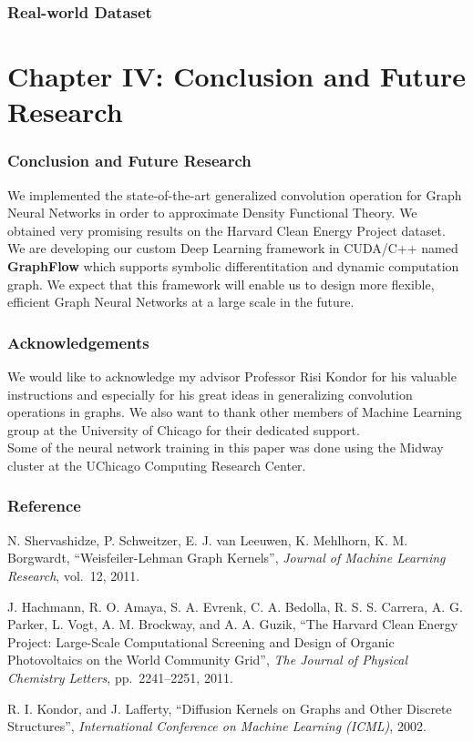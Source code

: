 \documentclass{beamer}
\begin{document}
\begin{frame}
\frametitle{Real-world Dataset}
\end{frame}

\section{Chapter IV: Conclusion and Future Research}

\begin{frame}
\frametitle{Conclusion and Future Research}
\begin{justify}
We implemented the state-of-the-art generalized convolution operation for Graph Neural Networks in order to approximate Density Functional Theory. We obtained very promising results on the Harvard Clean Energy Project dataset.
$$$$
We are developing our custom Deep Learning framework in CUDA/C++ named \textbf{GraphFlow} which supports symbolic differentitation and dynamic computation graph. We expect that this framework will enable us to design more flexible, efficient Graph Neural Networks at a large scale in the future.
\end{justify}
\end{frame}

\begin{frame}
\frametitle{Acknowledgements}
\begin{justify}
We would like to acknowledge my advisor Professor Risi Kondor for his valuable instructions and especially for his great ideas in generalizing convolution operations in graphs. We also want to thank other members of Machine Learning group at the University of Chicago for their dedicated support.
$$$$
Some of the neural network training in this paper was done using the Midway cluster at the UChicago Computing Research Center.
\end{justify}
\end{frame}

\begin{frame}
\frametitle{Reference}
\begin{justify}
\begin{thebibliography}{9}

   N. Shervashidze, P. Schweitzer, E. J. van Leeuwen, K. Mehlhorn, K. M. Borgwardt,
   ``Weisfeiler-Lehman Graph Kernels'',
   \textit{Journal of Machine Learning Research}, vol.~12, 2011.
   
   J. Hachmann, R. O. Amaya, S. A. Evrenk, C. A. Bedolla, R. S. S. Carrera, A. G. Parker, L. Vogt, A. M. Brockway, and A. A. Guzik,
   ``The Harvard Clean Energy Project: Large-Scale Computational Screening and Design of Organic Photovoltaics on the World Community Grid'',
   \textit{The Journal of Physical Chemistry Letters}, pp.~2241--2251, 2011.

   R. I. Kondor, and J. Lafferty,
   ``Diffusion Kernels on Graphs and Other Discrete Structures'',
   \textit{International Conference on Machine Learning (ICML)}, 2002.
   
\end{thebibliography}
\end{justify}
\end{frame}
\end{document}
